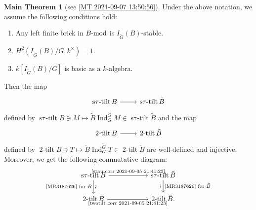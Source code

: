 \documentclass[pdftex,a4paper]{article}
\numberwithin{equation}{subsection}
\theoremstyle{definition}
\newtheorem{maintheorem}[theorem]{Main Theorem}
\newcommand{\lmod}{\operatorname{\mathrm{\hspace{-2pt}-mod}}}
\newcommand{\twotilt}{\operatorname{\mathrm{2-tilt}}}
\newcommand{\induc}{{\operatorname{Ind}\nolimits}}
\newcommand{\stautilt}{\operatorname{\mathrm{s\tau-tilt}}}
\newcommand{\inertiagp}{I}
\begin{document}
\begin{maintheorem}[{see \cref{MT 2021-09-07 13:50:56}}]\label{MT 2021-09-05 21:34:22}
	Under the above notation, we assume the following conditions hold:
	\begin{enumerate}
		\item Any left finite brick in \(B\lmod\) is \(\inertiagp_{\tilde G}(B)\)-stable.
		\item \(H^2(\inertiagp_{\tilde{G}}(B)/G,k^\times)=1\).
		\item \(k[\inertiagp_{\tilde{G}}(B)/G]\) is basic as a \(k\)-algebra.
	\end{enumerate}
	Then the map
	\begin{equation}\label{stau corr 2021-09-05 21:41:23}
		\begin{tikzcd}[ampersand replacement=\&,row sep=1pt]
			\stautilt B \ar[r]\&\stautilt \tilde{B}\\
		\end{tikzcd}
	\end{equation}
	defined by \(\stautilt B\ni M\mapsto \tilde{B}\induc_G^{\tilde{G}} M \in \stautilt \tilde{B}\) and the map
	\begin{equation}\label{twotilt corr 2021-09-05 21:41:23}
		\begin{tikzcd}[ampersand replacement=\&,row sep=1pt]
			\twotilt B \ar[r]\&\twotilt \tilde{B}\\
		\end{tikzcd}
	\end{equation}
	defined by \(\twotilt B\ni T\mapsto \tilde{B}\induc_G^{\tilde{G}} T \in \twotilt \tilde{B}\) are well-defined and injective.
	Moreover, we get the following  commutative diagram:
	\begin{equation}
		\begin{tikzcd}[ampersand replacement=\&, column sep=2cm]
			\stautilt B\ar[d,"\text{\cite{MR3187626} for \(B\)}"',"\wr"] \ar[r,"\text{\eqref{stau corr 2021-09-05 21:41:23}}"]\&\stautilt \tilde{B} \ar[d,"\text{\cite{MR3187626} for \(\tilde{B}\)}","\wr"']\\
			\twotilt B\ar[r,"\text{\eqref{twotilt corr 2021-09-05 21:41:23}}"']\&\twotilt \tilde{B}.
		\end{tikzcd}
	\end{equation}
\end{maintheorem}
\end{document}
